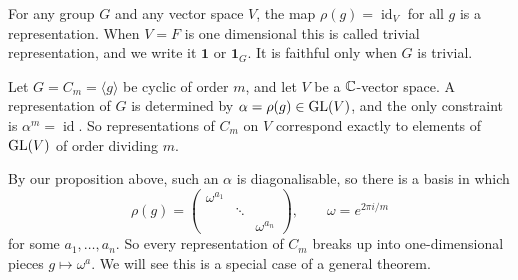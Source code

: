 \documentclass[a4paper]{scrartcl}
\newcommand{\id}{\operatorname{id}}
\newcommand{\gen}[1]{\langle #1 \rangle}
\begin{document}
\begin{example}
	For any group $G$ and any vector space $V$, the map $\rho(g) = \id_V$ for all $g$ is a representation. When $V = F$ is one dimensional this is called  trivial representation, and we write it $\mathbf{1}$ or $\mathbf{1}_G$. It is faithful only when $G$ is trivial.
\end{example}

\begin{example}
	Let $G = C_m = \gen{g}$ be cyclic of order $m$, and let $V$ be a $\mathbb{C}$-vector space. A representation of $G$ is determined by $\alpha = \rho(g) \in \operatorname{GL}(V)$, and the only constraint is $\alpha^m = \id$. So representations of $C_m$ on $V$ correspond exactly to elements of $\operatorname{GL}(V)$ of order dividing $m$.

	By our proposition above, such an $\alpha$ is diagonalisable, so there is a basis in which
	$$\rho(g) = \begin{pmatrix} \omega^{a_1} & & \\ & \ddots & \\ & & \omega^{a_n}\end{pmatrix}, \qquad \omega = e^{2\pi i /m}$$
	for some $a_1, \dots, a_n$. So every representation of $C_m$ breaks up into one-dimensional pieces $g \mapsto \omega^{a}$. We will see this is a special case of a general theorem.
\end{example}
\end{document}
